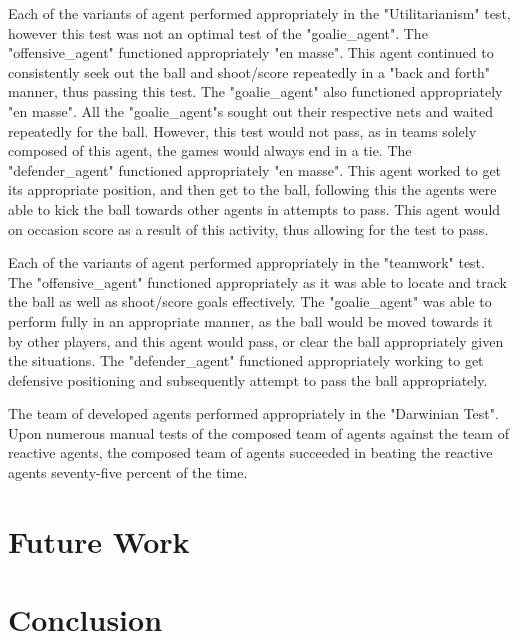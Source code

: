 \documentclass[conference]{IEEEtran}
\begin{document}
Each of the variants of agent performed appropriately in the "Utilitarianism" test, however this test was not an optimal test of the "goalie\_agent".
The "offensive\_agent" functioned appropriately "en masse".
This agent continued to consistently seek out the ball and shoot/score repeatedly in a "back and forth" manner, thus passing this test.
The "goalie\_agent" also functioned appropriately "en masse".
All the "goalie\_agent"s sought out their respective nets and waited repeatedly for the ball.
However, this test would not pass, as in teams solely composed of this agent, the games would always end in a tie.
The "defender\_agent" functioned appropriately "en masse".
This agent worked to get its appropriate position, and then get to the ball, following this the agents were able to kick the ball towards other agents in attempts to pass.
This agent would on occasion score as a result of this activity, thus allowing for the test to pass.

Each of the variants of agent performed appropriately in the "teamwork" test.
The "offensive\_agent" functioned appropriately as it was able to locate and track the ball as well as shoot/score goals effectively.
The "goalie\_agent" was able to perform fully in an appropriate manner, as the ball would be moved towards it by other players, and this agent would pass, or clear the ball appropriately given the situations.
The "defender\_agent" functioned appropriately working to get defensive positioning and subsequently attempt to pass the ball appropriately.

The team of developed agents performed appropriately in the "Darwinian Test".
Upon numerous manual tests of the composed team of agents against the team of reactive agents, the composed team of agents succeeded in beating the reactive agents seventy-five percent of the time.


\section{Future Work}

\section{Conclusion}
\end{document}
